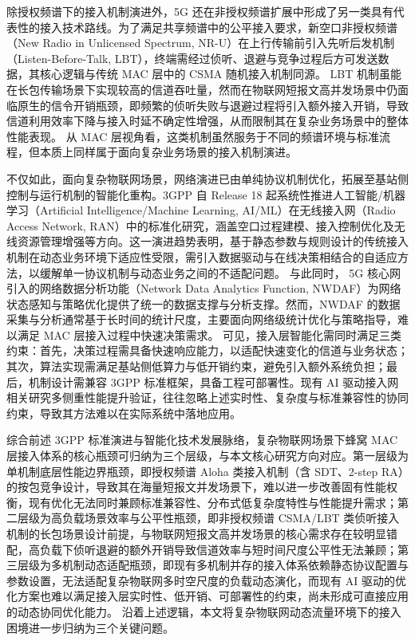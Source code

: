 除授权频谱下的接入机制演进外，5G 还在非授权频谱扩展中形成了另一类具有代表性的接入技术路线。为了满足共享频谱中的公平接入要求，新空口非授权频谱（New Radio in Unlicensed Spectrum, NR-U）在上行传输前引入先听后发机制（Listen-Before-Talk, LBT），终端需经过侦听、退避与竞争过程后方可发送数据\cite{2016_LAA,2020_He,2024_NRU}，其核心逻辑与传统 MAC 层中的 CSMA 随机接入机制同源。
LBT 机制虽能在长包传输场景下实现较高的信道吞吐量，然而在物联网短报文高并发场景中仍面临原生的信令开销瓶颈，即频繁的侦听失败与退避过程将引入额外接入开销，导致信道利用效率下降与接入时延不确定性增强，从而限制其在复杂业务场景中的整体性能表现。
从 MAC 层视角看，这类机制虽然服务于不同的频谱环境与标准流程，但本质上同样属于面向复杂业务场景的接入机制演进。

不仅如此，面向复杂物联网场景，网络演进已由单纯协议机制优化，拓展至基站侧控制与运行机制的智能化重构。3GPP 自 Release 18 起系统性推进人工智能/机器学习（Artificial Intelligence/Machine Learning, AI/ML）在无线接入网（Radio Access Network, RAN）中的标准化研究，涵盖空口过程建模、接入控制优化及无线资源管理增强等方向\cite{3GPP_TR38.843,3GPP_RP-234039}。这一演进趋势表明，基于静态参数与规则设计的传统接入机制在动态业务环境下适应性受限，需引入数据驱动与在线决策相结合的自适应方法，以缓解单一协议机制与动态业务之间的不适配问题。
与此同时， 5G 核心网引入的网络数据分析功能（Network Data Analytics Function, NWDAF）\cite{2023_Jin}为网络状态感知与策略优化提供了统一的数据支撑与分析支撑。然而，NWDAF 的数据采集与分析通常基于长时间的统计尺度，主要面向网络级统计优化与策略指导，难以满足 MAC 层接入过程中快速决策需求。
可见，接入层智能化需同时满足三类约束\cite{2025_AI_IIoT}：首先，决策过程需具备快速响应能力，以适配快速变化的信道与业务状态；其次，算法实现需满足基站侧低算力与低开销约束，避免引入额外系统负担；最后，机制设计需兼容 3GPP 标准框架，具备工程可部署性。现有 AI 驱动接入网相关研究多侧重性能提升验证，往往忽略上述实时性、复杂度与标准兼容性的协同约束，导致其方法难以在实际系统中落地应用。

综合前述 3GPP 标准演进与智能化技术发展脉络，复杂物联网场景下蜂窝 MAC 层接入体系的核心瓶颈可归纳为三个层级，与本文核心研究方向对应。第一层级为单机制底层性能边界瓶颈，即授权频谱 Aloha 类接入机制（含 SDT、2-step RA）的按包竞争设计，导致其在海量短报文并发场景下，难以进一步改善固有性能权衡，现有优化无法同时兼顾标准兼容性、分布式低复杂度特性与性能提升需求；第二层级为高负载场景效率与公平性瓶颈，即非授权频谱 CSMA/LBT 类侦听接入机制的长包场景设计前提，与物联网短报文高并发场景的核心需求存在较明显错配，高负载下侦听退避的额外开销导致信道效率与短时间尺度公平性无法兼顾；第三层级为多机制动态适配瓶颈，即现有多机制并存的接入体系依赖静态协议配置与参数设置，无法适配复杂物联网多时空尺度的负载动态演化，而现有 AI 驱动的优化方案也难以满足接入层实时性、低开销、可部署性的约束，尚未形成可直接应用的动态协同优化能力。
沿着上述逻辑，本文将复杂物联网动态流量环境下的接入困境进一步归纳为三个关键问题。

